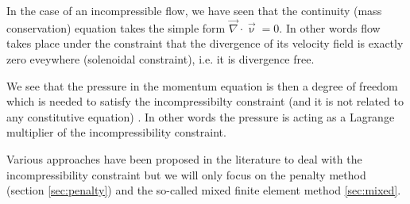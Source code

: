 
In the case of an incompressible flow, we have seen that the continuity (mass conservation)
equation takes the simple form ${\vec \nabla}\cdot{\vec \upnu}=0$. In other words flow takes place 
under the constraint that the divergence of its velocity field is exactly zero eveywhere 
(solenoidal constraint), i.e. it is divergence free. 

We see that the pressure in the momentum equation is then a degree of freedom which is needed 
to satisfy the incompressibilty constraint (and it is not related to any constitutive equation)
\cite{dohu03}. In other words the pressure is acting as a Lagrange multiplier of the incompressibility
constraint. 

Various approaches have been proposed in the literature to deal with the 
incompressibility constraint but we will only focus on the penalty method 
(section \ref{sec:penalty}) and the so-called mixed finite element method
\ref{sec:mixed}.
